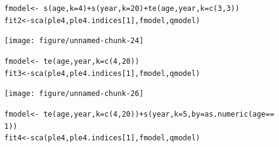 \documentclass[a4paper,english,10pt]{article}\usepackage[]{graphicx}\usepackage[]{color}
\makeatletter
\newcommand{\hlnum}[1]{\textcolor[rgb]{0.2,0.2,0.2}{#1}}%
\newcommand{\hlopt}[1]{\textcolor[rgb]{0.2,0.2,0.2}{#1}}%
\newcommand{\hlstd}[1]{\textcolor[rgb]{0,0,0}{#1}}%
\newcommand{\hlkwb}[1]{\textcolor[rgb]{0.361,0.506,0.596}{#1}}%
\newcommand{\hlkwc}[1]{\textcolor[rgb]{0.361,0.506,0.596}{#1}}%
\newcommand{\hlkwd}[1]{\textcolor[rgb]{0.361,0.506,0.596}{#1}}%
\newenvironment{kframe}{%
 \def\at@end@of@kframe{}%
 \ifinner\ifhmode%
  \def\at@end@of@kframe{\end{minipage}}%
  \begin{minipage}{\columnwidth}%
 \fi\fi%
 \def\FrameCommand##1{\hskip\@totalleftmargin \hskip-\fboxsep
 \colorbox{shadecolor}{##1}\hskip-\fboxsep
     \hskip-\linewidth \hskip-\@totalleftmargin \hskip\columnwidth}%
 \MakeFramed {\advance\hsize-\width
   \@totalleftmargin\z@ \linewidth\hsize
   \@setminipage}}%
 {\par\unskip\endMakeFramed%
 \at@end@of@kframe}
\newenvironment{knitrout}{}{} %
\makeatother
\begin{document}
\begin{knitrout}
\color{fgcolor}\begin{kframe}
\begin{alltt}
\hlstd{fmodel} \hlkwb{<-} \hlopt{~}\hlkwd{s}\hlstd{(age,} \hlkwc{k} \hlstd{=} \hlnum{4}\hlstd{)} \hlopt{+} \hlkwd{s}\hlstd{(year,} \hlkwc{k} \hlstd{=} \hlnum{20}\hlstd{)} \hlopt{+} \hlkwd{te}\hlstd{(age, year,} \hlkwc{k} \hlstd{=} \hlkwd{c}\hlstd{(}\hlnum{3}\hlstd{,} \hlnum{3}\hlstd{))}
\hlstd{fit2} \hlkwb{<-} \hlkwd{sca}\hlstd{(ple4, ple4.indices[}\hlnum{1}\hlstd{], fmodel, qmodel)}
\end{alltt}
\end{kframe}
\end{knitrout}


\begin{knitrout}
\color{fgcolor}

{\centering \texttt{[image: figure/unnamed-chunk-24]} 

}



\end{knitrout}


\begin{knitrout}
\color{fgcolor}\begin{kframe}
\begin{alltt}
\hlstd{fmodel} \hlkwb{<-} \hlopt{~}\hlkwd{te}\hlstd{(age, year,} \hlkwc{k} \hlstd{=} \hlkwd{c}\hlstd{(}\hlnum{4}\hlstd{,} \hlnum{20}\hlstd{))}
\hlstd{fit3} \hlkwb{<-} \hlkwd{sca}\hlstd{(ple4, ple4.indices[}\hlnum{1}\hlstd{], fmodel, qmodel)}
\end{alltt}
\end{kframe}
\end{knitrout}


\begin{knitrout}
\color{fgcolor}

{\centering \texttt{[image: figure/unnamed-chunk-26]} 

}



\end{knitrout}


\begin{knitrout}
\color{fgcolor}\begin{kframe}
\begin{alltt}
\hlstd{fmodel} \hlkwb{<-} \hlopt{~}\hlkwd{te}\hlstd{(age, year,} \hlkwc{k} \hlstd{=} \hlkwd{c}\hlstd{(}\hlnum{4}\hlstd{,} \hlnum{20}\hlstd{))} \hlopt{+} \hlkwd{s}\hlstd{(year,} \hlkwc{k} \hlstd{=} \hlnum{5}\hlstd{,} \hlkwc{by} \hlstd{=} \hlkwd{as.numeric}\hlstd{(age} \hlopt{==}
    \hlnum{1}\hlstd{))}
\hlstd{fit4} \hlkwb{<-} \hlkwd{sca}\hlstd{(ple4, ple4.indices[}\hlnum{1}\hlstd{], fmodel, qmodel)}
\end{alltt}
\end{kframe}
\end{knitrout}
\end{document}
